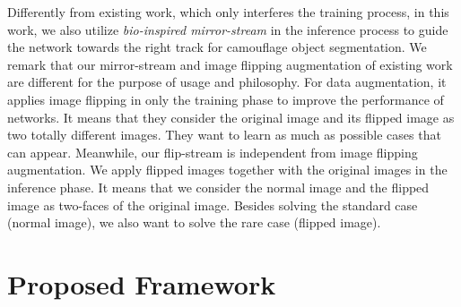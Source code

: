 \documentclass[journal]{IEEEtran}
\begin{document}
Differently from existing work, which only interferes the training process, in this work, we also utilize \textit{bio-inspired mirror-stream} in the inference process to guide the network towards the right track for camouflage object segmentation. We remark that our mirror-stream and image flipping augmentation of existing work are different for the purpose of usage and philosophy. For data augmentation, it applies image flipping in only the training phase to improve the performance of networks. It means that they consider the original image and its flipped image as two totally different images. They want to learn as much as possible cases that can appear. Meanwhile, our flip-stream is independent from image flipping augmentation. We apply flipped images together with the original images in the inference phase. It means that we consider the normal image and the flipped image as two-faces of the original image. Besides solving the standard case (normal image), we also want to solve the rare case (flipped image).




































\section{Proposed Framework}
\label{sec:framework}
\end{document}
